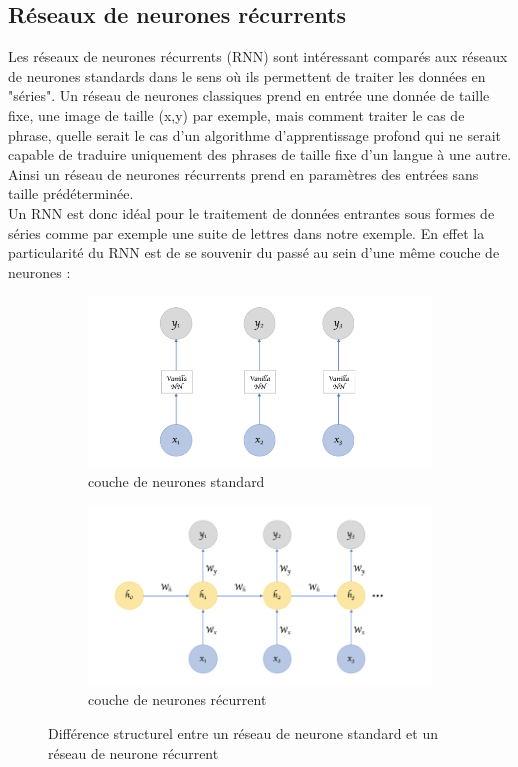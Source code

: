 \documentclass[oneside,a4paper,13pt]{article}
\begin{document}
\subsection*{Réseaux de neurones récurrents}
Les réseaux de neurones récurrents (RNN) sont intéressant comparés aux réseaux de neurones standards dans le sens où ils permettent de traiter les données en "séries". Un réseau de neurones classiques prend en entrée une donnée de taille fixe, une image de taille (x,y) par exemple, mais comment traiter le cas de phrase, quelle serait le cas d'un algorithme d'apprentissage profond qui ne serait capable de traduire uniquement des phrases de taille fixe d'un langue à une autre. Ainsi un réseau de neurones récurrents prend en paramètres des entrées sans taille prédéterminée.\\
Un RNN est donc idéal pour le traitement de données entrantes sous formes de séries comme par exemple une suite de lettres dans notre exemple. En effet la particularité du RNN est de se souvenir du passé au sein d'une même couche de neurones :
\begin{figure}[H]

\begin{subfigure}{0.5\textwidth}
\includegraphics[scale=0.4]{Images/vanilla.PNG} 
\caption{couche de neurones standard}
\label{fig:subim1}
\end{subfigure}
\begin{subfigure}{0.5\textwidth}
\includegraphics[scale=0.4]{Images/RNN.PNG}
\caption{couche de neurones récurrent}
\label{fig:subim2}
\end{subfigure}

\caption{Différence structurel entre un réseau de neurone standard et un réseau de neurone récurrent}
\label{fig:image1}
\end{figure}
\end{document}
